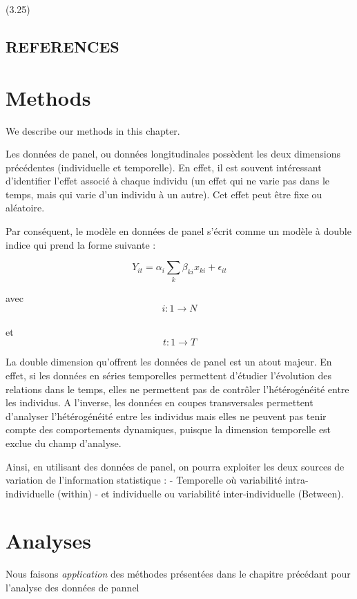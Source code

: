 \documentclass[
]{book}
\begin{document}
(3.25)

\hypertarget{references}{%
\section{REFERENCES}\label{references}}

\hypertarget{methods}{%
\chapter{Methods}\label{methods}}

We describe our methods in this chapter.

Les données de panel, ou données longitudinales possèdent les deux dimensions précédentes (individuelle et temporelle). En effet, il est souvent intéressant d'identifier l'effet associé à chaque individu (un effet qui ne varie pas dans le temps, mais qui varie d'un individu à un autre). Cet effet peut être fixe ou aléatoire.

Par conséquent, le modèle en données de panel s'écrit comme un modèle à double indice qui prend la forme suivante :

\[ Y_{it}= \alpha_i\sum_{k}\beta_{ki}x_{ki}+ \epsilon_{it} \]

avec
\[ i:1 \rightarrow N \]\\
et
\[ t:1 \rightarrow T \]

La double dimension qu'offrent les données de panel est un atout majeur. En effet, si les données en séries temporelles permettent d'étudier l'évolution des relations dans le temps, elles ne permettent pas de contrôler l'hétérogénéité entre les individus. A l'inverse, les données en coupes transversales permettent d'analyser l'hétérogénéité entre les individus mais elles ne peuvent pas tenir compte des comportements dynamiques, puisque la dimension temporelle est exclue du champ d'analyse.

Ainsi, en utilisant des données de panel, on pourra exploiter les deux sources de variation de l'information statistique :
- Temporelle où variabilité intra-individuelle (within)
- et individuelle ou variabilité inter-individuelle (Between).

\hypertarget{analyses}{%
\chapter{Analyses}\label{analyses}}

Nous faisons \emph{application} des méthodes présentées dans le chapitre précédant pour l'analyse des données de pannel
\end{document}
